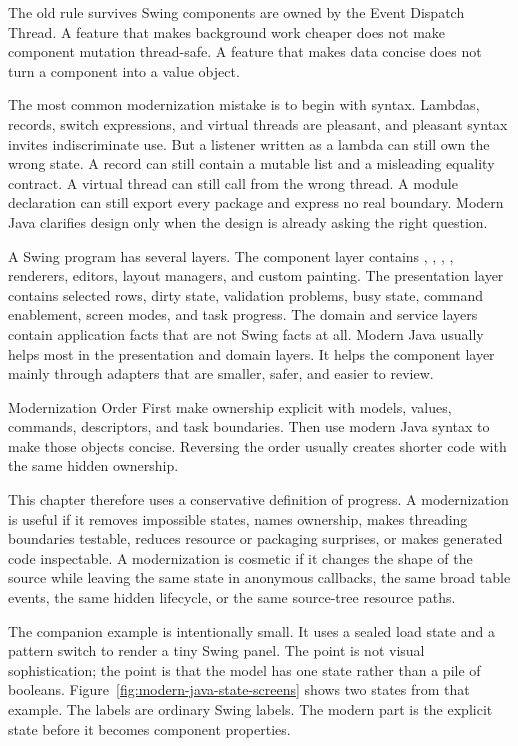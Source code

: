 \begin{principlebox}{The old rule survives}
Swing components are owned by the Event Dispatch Thread. A feature that makes background work cheaper does not make component mutation thread-safe. A feature that makes data concise does not turn a component into a value object.
\end{principlebox}

The most common modernization mistake is to begin with syntax. Lambdas, records, switch expressions, and virtual threads are pleasant, and pleasant syntax invites indiscriminate use. But a listener written as a lambda can still own the wrong state. A record can still contain a mutable list and a misleading equality contract. A virtual thread can still call  from the wrong thread. A module declaration can still export every package and express no real boundary. Modern Java clarifies design only when the design is already asking the right question.

A Swing program has several layers. The component layer contains , , , , renderers, editors, layout managers, and custom painting. The presentation layer contains selected rows, dirty state, validation problems, busy state, command enablement, screen modes, and task progress. The domain and service layers contain application facts that are not Swing facts at all. Modern Java usually helps most in the presentation and domain layers. It helps the component layer mainly through adapters that are smaller, safer, and easier to review.

\begin{migrationbox}{Modernization Order}
First make ownership explicit with models, values, commands, descriptors, and task boundaries. Then use modern Java syntax to make those objects concise. Reversing the order usually creates shorter code with the same hidden ownership.
\end{migrationbox}

This chapter therefore uses a conservative definition of progress. A modernization is useful if it removes impossible states, names ownership, makes threading boundaries testable, reduces resource or packaging surprises, or makes generated code inspectable. A modernization is cosmetic if it changes the shape of the source while leaving the same state in anonymous callbacks, the same broad table events, the same hidden lifecycle, or the same source-tree resource paths.

The companion example is intentionally small. It uses a sealed load state and a pattern switch to render a tiny Swing panel. The point is not visual sophistication; the point is that the model has one state rather than a pile of booleans. Figure~\ref{fig:modern-java-state-screens} shows two states from that example. The labels are ordinary Swing labels. The modern part is the explicit state before it becomes component properties.

